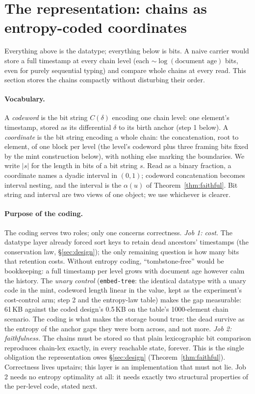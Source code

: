 \documentclass[11pt]{article}
\newcommand{\code}[1]{\texttt{#1}}
\begin{document}
\section{The representation: chains as entropy-coded coordinates}
\label{sec:encoding}

Everything above is the datatype; everything below is bits. A naive
carrier would store a full timestamp at every chain level (each
$\sim\!\log(\text{document age})$ bits, even for purely sequential
typing) and compare whole chains at every read. This section stores
the chains compactly without disturbing their order.

\paragraph{Vocabulary.} A \emph{codeword} is the bit string
$C(\delta)$ encoding one chain level: one element's timestamp,
stored as its differential $\delta$ to its birth anchor (step 1
below). A \emph{coordinate} is the bit string encoding a whole
chain: the concatenation, root to element, of one block per level
(the level's codeword plus three framing bits fixed by the mint
construction below), with nothing else marking the boundaries. We
write $|s|$ for the length in bits of a bit string $s$. Read as a
binary fraction, a coordinate names a dyadic interval in $(0,1)$;
codeword concatenation becomes interval nesting, and the interval is
the $\alpha(u)$ of Theorem~\ref{thm:faithful}. Bit string and
interval are two views of one object; we use whichever is clearer.

\paragraph{Purpose of the coding.} The coding serves two roles; only one
concerns correctness.
\emph{Job 1: cost.} The datatype layer already forced sort keys to
retain dead ancestors' timestamps (the conservation law,
\S\ref{sec:design}); the only remaining question is how many bits
that retention costs. Without entropy coding, ``tombstone-free''
would be bookkeeping: a full timestamp per level grows with document
age however calm the history. The \emph{unary control}
(\code{embed-tree}: the identical datatype with a unary code in the
mint, codeword length linear in the value, kept as the experiment's
cost-control arm; step 2 and the entropy-law table) makes the gap
measurable: 61\,KB against the coded design's 0.5\,KB on the table's
1000-element chain scenario. The coding is what makes
the storage bound true: the dead survive as the entropy of the
anchor gaps they were born across, and not more.
\emph{Job 2: faithfulness.} The chains must be stored so that plain
lexicographic bit comparison reproduces chain-lex exactly, in every
reachable state, forever. This is the single obligation the
representation owes \S\ref{sec:design}
(Theorem~\ref{thm:faithful}). Correctness lives upstairs; this layer
is an implementation that must not lie. Job 2 needs no entropy
optimality at all: it needs exactly two structural properties of the
per-level code, stated next.
\end{document}
